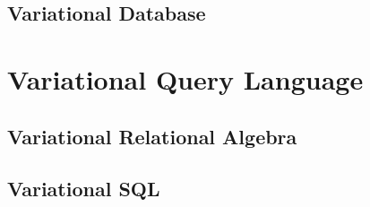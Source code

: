 \documentclass[onehalf,11pt]{beavtex}
\begin{document}
\section{Variational Database}
\label{sec:vdb}

\chapter{Variational Query Language}
\label{sec:vql}

\section{Variational Relational Algebra}
\label{sec:vra}

\section{Variational SQL}
\label{sec:vsql}
\end{document}
